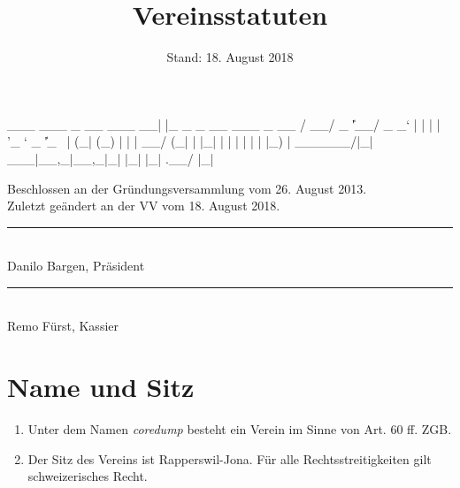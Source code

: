 \documentclass[10pt,a4paper,parskip,fleqn]{scrartcl}
\title{\Huge Vereinsstatuten}
\date{Stand: 18. August 2018}
\newcommand{\ol}{\begin{enumerate}[itemsep=-0.2em,topsep=-0.2em]}
\newcommand{\lo}{\end{enumerate}}
\newcommand{\li}{\item}
\begin{document}
\begin{verbbox}
  ___ ___  _ __ ___  __| |_   _ _ __ ___  _ __  
 / __/ _ \| '__/ _ \/ _` | | | | '_ ` _ \| '_ \ 
| (_| (_) | | |  __/ (_| | |_| | | | | | | |_) |
 \___\___/|_|  \___|\__,_|\__,_|_| |_| |_| .__/ 
                                         |_|    
\end{verbbox}

\begin{titlepage}

	\maketitle
	\thispagestyle{empty} %

  \begin{center}

		\vspace{1cm}

		\theverbbox

		\vfill

		\large Beschlossen an der Gründungsversammlung vom 26. August 2013.\\
		\vspace{1em}
		\large Zuletzt geändert an der VV vom 18. August 2018.

		\vspace{1.5cm}

		\begin{minipage}[t]{0.49\textwidth}
			\center
			\rule{5cm}{0.2mm}\\
			Danilo Bargen, Präsident
		\end{minipage}
		\begin{minipage}[t]{0.49\textwidth}
			\center
			\rule{5cm}{0.2mm}\\
			Remo Fürst, Kassier
		\end{minipage}

  \end{center}

\end{titlepage}


\section{Name und Sitz}

\ol
	\li Unter dem Namen \textit{coredump} besteht ein Verein im Sinne von Art. 60
	ff. ZGB.
	\li Der Sitz des Vereins ist Rapperswil-Jona. Für alle Rechtsstreitigkeiten
	gilt schweizerisches Recht.
\lo
\end{document}
